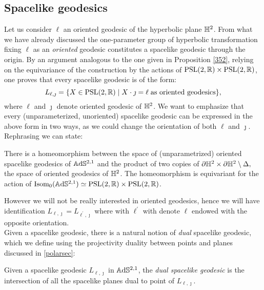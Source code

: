 \subsection{Spacelike geodesics}
Let us consider $\ell$ an oriented geodesic of the hyperbolic plane $\mathbb{H}^2$. From what we have already discussed the one-parameter group of hyperbolic transformation fixing $\ell$ as an \textit{oriented} geodesic constitutes a spacelike geodesic through the origin. By an argument analogous to the one given in Proposition \ref{352}, relying on the equivariance of the construction by the actions of $\text{PSL}(2,\mathbb{R})\times\text{PSL}(2,\mathbb{R})$, one proves that every spacelike geodesic is of the form: 
\[
    L_{\ell,\jmath}=\{X\in\text{PSL}(2,\mathbb{R})\;|\;X\cdot\jmath=\ell\;\text{as oriented geodesics}\},
\]
where $\ell$ and $\jmath$ denote oriented geodesic of $\mathbb{H}^2$. We want to emphasize that every (unparameterized, unoriented) spacelike geodesic can be expressed in the above form in two ways, as we could change the orientation of both $\ell$ and $\jmath$. Rephrasing we can state: 
\begin{proposition}\label{353}
    There is a homeomorphism between the space of (unparametrized) oriented spacelike geodesics of $\mathbb{A}\mathrm{d}\mathbb{S}^{2,1}$ and the product of two copies of $\partial\mathbb{H}^2\times\partial\mathbb{H}^2\setminus\Delta,$ the space of oriented geodesics of $\mathbb{H}^2$. The homeomorphism is equivariant for the action of $\text{Isom}_0(\mathbb{A}\mathrm{d}\mathbb{S}^{2,1})\simeq\text{PSL}(2,\mathbb{R})\times\text{PSL}(2,\mathbb{R})$.
\end{proposition}

However we will not be really interested in oriented geodesics, hence we will have identification $L_{\ell,\jmath}=L_{\ell^{\prime},\jmath}$ where with $\ell^{\prime} $ with denote $\ell$ endowed with the opposite orientation.\\
Given a spacelike geodesic, there is a natural notion of \textit{dual} spacelike geodesic, which we define using the projectivity duality between points and planes discussed in \ref{polarsec}: 
\begin{definition}
    Given a spacelike geodesic $L_{\ell,\jmath}$ in $\mathbb{A}\mathrm{d}\mathbb{S}^{2,1}$, the \textit{dual spacelike geodesic} is the intersection of all the spacelike planes dual to point of $L_{\ell,\jmath}.$  
\end{definition}

